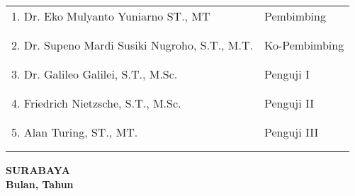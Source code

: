     \noindent
    \begin{tabularx}{\textwidth}{X l}
      1. Dr. Eko Mulyanto Yuniarno ST., MT          & Pembimbing \\
      &  \\
      &  \\
      2. Dr. Supeno Mardi Susiki Nugroho, S.T., M.T.     & Ko-Pembimbing \\
      &  \\
      &  \\
      3. Dr. Galileo Galilei, S.T., M.Sc.  & Penguji I \\
      &  \\
      &  \\
      4. Friedrich Nietzsche, S.T., M.Sc.  & Penguji II \\
      &  \\
      &  \\
      5. Alan Turing, ST., MT.             & Penguji III \\
      &  \\
      &  \\
    \end{tabularx}
  \endgroup

  \vspace{12ex}




  \begin{center}
    \textbf{SURABAYA\\Bulan, Tahun}
  \end{center}
\endgroup
